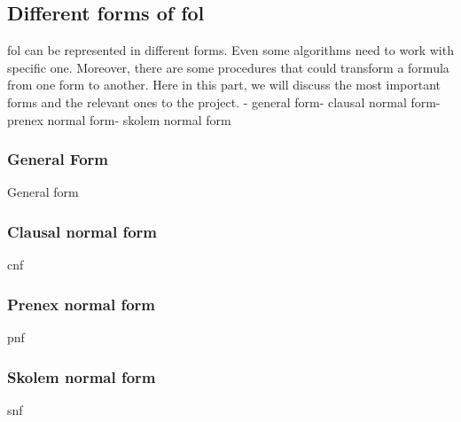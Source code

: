 \subsection{Different forms of \ac{fol}}\label{sub:c2s1s1}
\ac{fol} can be represented in different forms. Even some algorithms need to work with specific one.
Moreover, there are some procedures that could transform a formula from one form to another.
Here in this part, we will discuss the most important forms and the relevant ones to the project.
- general form- clausal normal form- prenex normal form- skolem normal form

\subsubsection{General Form}
General form

\subsubsection{Clausal normal form}
\ac{cnf}

\subsubsection{Prenex normal form}
\ac{pnf}

\subsubsection{Skolem normal form}
\ac{snf}
